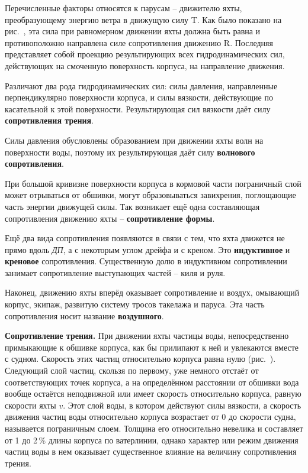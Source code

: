 Перечисленные факторы относятся к парусам \--- движителю яхты,
преобразующему энергию ветра в движущую силу \ve T. Как было показано
на рис.~, эта сила при равномерном движении яхты должна быть
равна и противоположно направлена силе сопротивления движению \ve
R. Последняя представляет собой проекцию результирующих всех
гидродинамических сил, действующих на смоченную поверхность корпуса,
на направление движения.

Различают два рода гидродинамических сил: силы давления, направленные
перпендикулярно поверхности корпуса, и силы вязкости, действующие по
касательной к этой поверхности. Результирующая сил вязкости даёт силу
\textbf{сопротивления трения}.

Силы давления обусловлены образованием при движении яхты волн на
поверхности воды, поэтому их результирующая даёт силу
\textbf{волнового сопротивления}.

При большой кривизне поверхности корпуса в кормовой части пограничный
слой может отрываться от обшивки, могут образовываться завихрения,
поглощающие часть энергии движущей силы. Так возникает ещё одна
составляющая сопротивления движению яхты \--- \textbf{сопротивление
  формы}.

Ещё два вида сопротивления появляются в связи с тем, что яхта движется
не прямо вдоль \textit{ДП}, а с некоторым углом дрейфа и с креном. Это
\textbf{индуктивное} и
\textbf{креновое} сопротивления. Существенную
долю в индуктивном сопротивлении занимает сопротивление выступающих
частей \--- киля и руля.

Наконец, движению яхты вперёд оказывает сопротивление и воздух,
омывающий корпус, экипаж, развитую систему тросов такелажа и
паруса. Эта часть сопротивления носит название \textbf{воздушного}.

\textbf{Сопротивление трения.} При
движении яхты частицы воды, непосредственно примыкающие к обшивке
корпуса, как бы прилипают к ней и увлекаются вместе с судном. Скорость
этих частиц относительно корпуса равна нулю (рис.~). Следующий
слой частиц, скользя по первому, уже немного отстаёт от
соответствующих точек корпуса, а на определённом расстоянии от обшивки
вода вообще остаётся неподвижной или имеет скорость относительно
корпуса, равную скорости яхты $v$. Этот слой воды, в котором действуют
силы вязкости, а скорость движения частиц воды относительно корпуса
возрастает от 0 до скорости судна, называется пограничным
слоем. Толщина его относительно невелика и составляет от 1 до 2\,\%
длины корпуса по ватерлинии, однако характер или режим движения частиц
воды в нем оказывает существенное влияние на величину сопротивления
трения.

